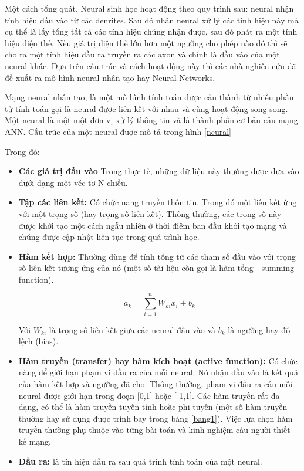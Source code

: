 	Một cách tổng quát, Neural sinh học hoạt động theo quy trình sau: neural nhận tính hiệu đầu vào từ các denrites. Sau đó nhân neural xử lý các tính hiệu này mà cụ thể là lấy tổng tất cả các tính hiệu chúng nhận được, sau đó phát ra một tính hiệu điện thế. Nếu giá trị điện thế lớn hơn một ngưỡng cho phép nào đó thì sẽ cho ra một tính hiệu đầu ra truyền ra các axon và chính là đầu vào của một neural khác. Dựa trên cấu trúc và cách hoạt động này thì các nhà nghiên cứu đã đề xuất ra mô hình neural nhân tạo hay Neural Networks.
	
	Mạng neural nhân tạo, là một mô hình tính toán được cấu thành từ nhiều phần tử tính toán gọi là neural được liên kết với nhau và cùng hoạt động song song. Một neural là một một đơn vị xử lý thông tin và là thành phần cơ bản cảu mạng ANN. Cấu trúc của một neural được mô tả trong hình \ref{neural} \par
	Trong đó: \par
	
	\begin{itemize}
		\item \textbf{Các giá trị đầu vào} Trong thực tế, những dữ liệu này thường được đưa vào dưới dạng một véc tơ N chiều.
		\item \textbf{Tập các liên kết:} Có chức năng truyền thôn tin. Trong đó một liên kết ứng với một trọng số (hay trọng số liên kết). Thông thường, các trọng số này được khởi tạo một cách ngẫu nhiên ở thời điêm ban đầu khởi tạo mạng và chúng được cập nhật liên tục trong quá trình học.
		\item \textbf{Hàm kết hợp:} Thường dùng để tính tổng từ các tham số đầu vào với trọng số liên kết tương ứng của nó (một số tài liệu còn gọi là hàm tổng - summing function).
	
		\[a_{k} = \sum_{i = 1}^nW_{ki}x_{i} + b_{k} \] 

		Với $W_{ki}$ là trọng số liên kết giữa các neural đầu vào và $b_{k}$ là ngưỡng hay độ lệch (bias).
		\item \textbf{Hàm truyền (transfer) hay hàm kích hoạt (active function):} Có chức năng để giới hạn phạm vi đầu ra của mỗi neural. Nó nhận đầu vào là kết quả của hàm kết hợp và ngưỡng đã cho. Thông thường, phạm vi đầu ra cảu mỗi neural được giới hạn trong đoạn [0,1] hoặc [-1,1]. Các hàm truyền rất đa dạng, có thể là hàm truyền tuyến tính hoặc phi tuyến (một số hàm truyền thường hay sử dụng được trình bay trong bảng \ref{bang1}). Việc lựa chọn hàm truyền thường phụ thuộc vào từng bài toán và kinh nghiệm cảu người thiết kế mạng. 
		\item \textbf{Đầu ra:} là tín hiệu đầu ra sau quá trình tính toán của một neural.
	\end{itemize}	

